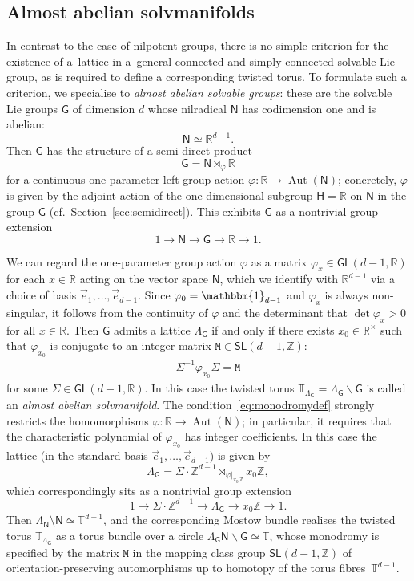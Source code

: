 \documentclass[pdftex]{sigma}
\numberwithin{equation}{section}
\newcommand{\unit}{\mathbbm{1}} 			%
\newcommand{\sfG}{\mathsf{G}}
\newcommand{\sfH}{\mathsf{H}}
\newcommand{\sfN}{\mathsf{N}}
\newcommand{\sfGL}{\mathsf{GL}}
\newcommand{\sfSL}{\mathsf{SL}}
\newcommand{\ttM}{\mathtt{M}}
\newcommand{\Aut}{\operatorname{Aut}}
\newcommand{\R}{\real}
\newcommand{\zed}{{\mathbb Z}} %
\newcommand{\real}{{\mathbb R}} %
\newcommand{\torus}{{\mathbb T}} %
\begin{document}
\subsection{Almost abelian solvmanifolds}\label{sec:abeliansolv}

In contrast to the case of nilpotent groups, there is no
simple criterion for the existence of a~lattice in a~general
connected and simply-connected solvable Lie group, as is required to define a corresponding twisted
torus. To formulate such a criterion, we specialise to \emph{almost
abelian solvable groups}: these are the solvable Lie groups $\sfG$ of
dimension $d$
whose nilradical $\sfN$ has codimension one and is abelian:
\[
\sfN \simeq \real^{d-1} .
\]
Then $\sfG$ has the
structure of a semi-direct product
\[
\sfG = \sfN\rtimes_\varphi\real
\]
for a continuous one-parameter left group action
$\varphi\colon \real\to\Aut(\sfN)$; concretely, $\varphi$ is given by the
adjoint action of the one-dimensional subgroup $\sfH=\real$ on $\sfN$
in the group $\sfG$ (cf.~Section~\ref{sec:semidirect}). This exhibits
$\sfG$ as a nontrivial group extension
\[
1\longrightarrow \sfN \longrightarrow \sfG \longrightarrow \R \longrightarrow 1 .
\]

We can regard the one-parameter group action $\varphi$ as a matrix
$\varphi_x\in\sfGL(d-1,\real)$ for each $x\in\real$ acting on the
vector space $\sfN$, which we identify with $\real^{d-1}$ via a choice
of basis $\vec e_1,\ldots,\vec e_{d-1}$. Since
$\varphi_{0}=\unit_{d-1}$ and $\varphi_x$ is always non-singular, it
follows from the continuity of $\varphi$ and the determinant that
$\det\varphi_x>0$ for all $x\in\real$. Then $\sfG$ admits a lattice
$\Lambda_\sfG$ if and
only if there exists $x_0\in\real^\times$ such that $\varphi_{x_0}$ is
conjugate to an integer matrix $\ttM\in\sfSL(d-1,\zed)$:
\begin{gather}\label{eq:monodromydef}
\Sigma^{-1} \varphi_{x_0} \Sigma=\ttM
\end{gather}
for some
$\Sigma\in\sfGL(d-1,\real)$.
In this case the twisted torus
$\torus_{\Lambda_\sfG}=\Lambda_{\sfG}\backslash \sfG$ is called an {\emph{almost abelian solvmanifold}}.
The condition~\eqref{eq:monodromydef} strongly restricts the homomorphisms
$\varphi\colon \real\to\Aut(\sfN)$; in particular, it requires that the
characteristic polynomial of $\varphi_{x_0}$ has integer
coefficients. In this case the lattice (in the standard basis $\vec
e_1,\ldots,\vec e_{d-1}$) is given by
\[%
\Lambda_\sfG = \Sigma\cdot\zed^{d-1}\rtimes_{\varphi|_{x_0\,\zed}}
x_0 \zed ,
\]
which correspondingly sits as a nontrivial group extension
\[
1\longrightarrow \Sigma \cdot \zed^{d-1} \longrightarrow \Lambda_\sfG
\longrightarrow x_0 \zed \longrightarrow 1 .
\]
Then $\Lambda_{\sfN}\setminus\sfN\simeq\torus^{d-1}$, and the corresponding Mostow bundle realises the twisted torus
$\torus_{\Lambda_\sfG}$ as a torus bundle over a circle
$\Lambda_\sfG \sfN\backslash\sfG \simeq \torus$, whose monodromy
is specified by the matrix $\ttM$ in the mapping class group $\sfSL(d-1,\zed)$ of
orientation-preserving
automorphisms up to homotopy of the torus fibres~$\torus^{d-1}$.
\end{document}
